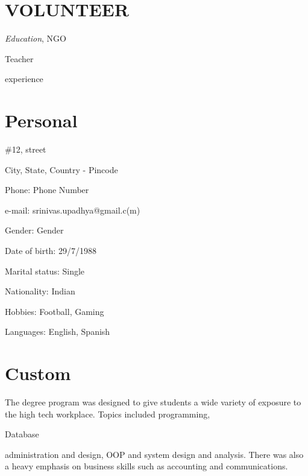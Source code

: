 \documentclass[11pt]{article}
\begin{document}
\section*{VOLUNTEER}
%
\begin{cvitem}
	\textit{Education}, NGO \par
	Teacher \par
	experience
\end{cvitem}%
%
\section*{Personal}
%
\begin{cvitem}
	\#12, street \par
	City, State, Country - Pincode \par
	Phone: Phone Number \par
	e-mail: srinivas.upadhya@gmail.c(m)\par
	Gender: Gender \par
	Date of birth: 29/7/1988 \par
	Marital status: Single \par
	Nationality: Indian \par
	Hobbies: Football, Gaming \par
	Languages: English, Spanish
\end{cvitem}%
%
\section*{Custom}
%
\begin{cvitem}
	The degree program was designed to give students a wide variety of exposure to the high tech
    workplace. Topics included programming, \par
	Database \par
	administration and design, OOP and system design and analysis. There was also a heavy emphasis on
    business skills such as accounting and communications.
\end{cvitem}%
\end{document}

